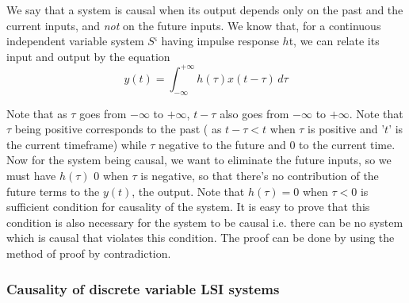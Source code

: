 We say that a system is causal when its output depends only on the past and the current inputs, and {\it not} on the future inputs. We know that, for a continuous independent variable system $S$` having impulse response $h$t, we can relate its input and output by the equation
\begin{equation}
y(t)=\int_{-\infty}^{+\infty} h(\tau)x(t-\tau)\,d\tau \nonumber
\end{equation}

Note that as $\tau$ goes from ${-\infty}$ to ${+\infty}$, $t-\tau$ also goes from ${-\infty}$ to ${+\infty}$. Note that $\tau$ being positive corresponds to the past ( as $t-\tau < t$ when $\tau$ is positive and '$t$' is the current timeframe) while $\tau$ negative to the future and 0 to the current time. Now for the system being causal, we want to eliminate the future inputs, so we must have $h(\tau)$ 0 when $\tau$ is negative, so that there's no contribution of the future terms to the $y(t)$, the output. Note that $h(\tau)=0$ when $\tau<0$ is sufficient condition for causality of the system. It is easy to prove that this condition is also necessary for the system to be causal i.e. there can be no system which is causal that violates this condition. The proof can be done by using the method of proof by contradiction.

\subsubsection{Causality of discrete variable LSI systems}

